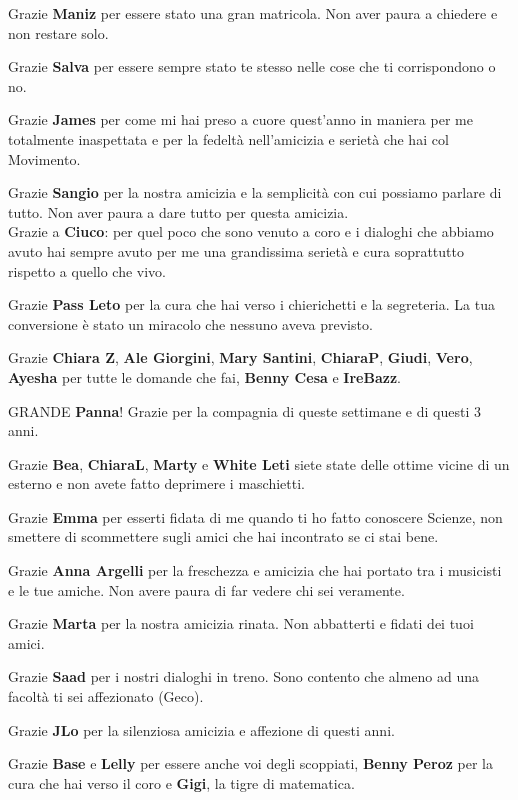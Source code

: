 Grazie \textbf{Maniz} per essere stato una gran matricola. Non aver paura a chiedere e non restare solo.

Grazie \textbf{Salva} per essere sempre stato te stesso nelle cose che ti corrispondono o no.

Grazie \textbf{James} per come mi hai preso a cuore quest'anno in maniera per me totalmente inaspettata e per la fedeltà nell'amicizia e serietà che hai col Movimento.

Grazie \textbf{Sangio} per la nostra amicizia e la semplicità con cui possiamo parlare di tutto. Non aver paura a dare tutto per questa amicizia. \\


Grazie a \textbf{Ciuco}: per quel poco che sono venuto a coro e i dialoghi che abbiamo avuto hai sempre avuto per me una grandissima serietà e cura soprattutto rispetto a quello che vivo.

Grazie \textbf{Pass Leto} per la cura che hai verso i chierichetti e la segreteria. La tua conversione è stato un miracolo che nessuno aveva previsto.

Grazie \textbf{Chiara Z}, \textbf{Ale Giorgini}, \textbf{Mary Santini}, \textbf{ChiaraP}, \textbf{Giudi}, \textbf{Vero}, \textbf{Ayesha} per tutte le domande che fai, \textbf{Benny Cesa} e \textbf{IreBazz}.

GRANDE \textbf{Panna}! Grazie per la compagnia di queste settimane e di questi 3 anni.

Grazie \textbf{Bea}, \textbf{ChiaraL}, \textbf{Marty} e \textbf{White Leti} siete state delle ottime vicine di un esterno e non avete fatto deprimere i maschietti.

Grazie \textbf{Emma} per esserti fidata di me quando ti ho fatto conoscere Scienze, non smettere di scommettere sugli amici che hai incontrato se ci stai bene.

Grazie \textbf{Anna Argelli} per la freschezza e amicizia che hai portato tra i musicisti e le tue amiche. Non avere paura di far vedere chi sei veramente.

Grazie \textbf{Marta} per la nostra amicizia rinata. Non abbatterti e fidati dei tuoi amici.

Grazie \textbf{Saad} per i nostri dialoghi in treno. Sono contento che almeno ad una facoltà ti sei affezionato (Geco).

Grazie \textbf{JLo} per la silenziosa amicizia e affezione di questi anni.

Grazie \textbf{Base} e \textbf{Lelly} per essere anche voi degli scoppiati, \textbf{Benny Peroz} per la cura che hai verso il coro e \textbf{Gigi}, la tigre di matematica. \\


